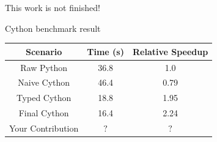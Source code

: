 \documentclass[12pt,xcolor=dvipsnames]{beamer}
\begin{document}
    \begin{frame}
        This work is not finished!
    \end{frame}

    \begin{frame}{Cython benchmark result}
        \begin{center}
        \begin{tabular}{ | c | c | c | }
            \hline
            Scenario & Time (s) & Relative Speedup \\
            \hline
            Raw Python & 36.8 & 1.0 \\
            Naive Cython & 46.4 & 0.79 \\
            Typed Cython & 18.8 & 1.95 \\
            Final Cython & 16.4 & 2.24 \\
            Your Contribution & $?$ & $?$ \\
            \hline
        \end{tabular}
        \end{center}
    \end{frame}
\end{document}
